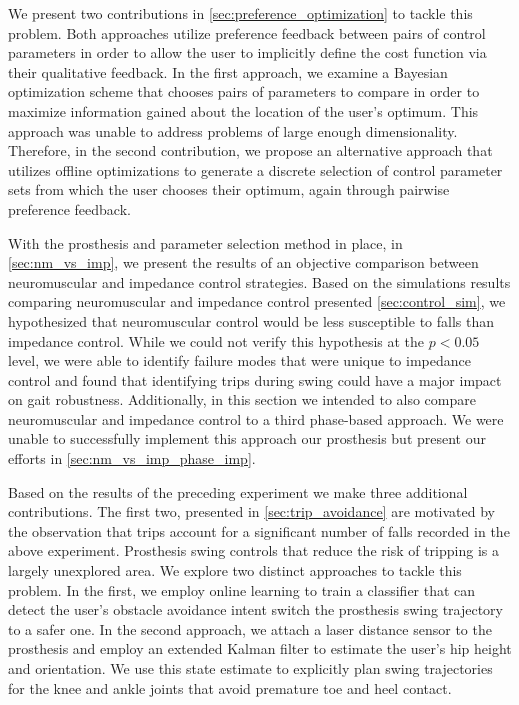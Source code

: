 We present two contributions in \cref{sec:preference_optimization} to tackle
this problem. Both approaches utilize preference feedback between pairs of
control parameters in order to allow the user to implicitly define the cost
function via their qualitative feedback. In the first approach, we examine a
Bayesian optimization scheme that chooses pairs of parameters to compare in
order to maximize information gained about the location of the user's optimum.
This approach was unable to address problems of large enough dimensionality.
Therefore, in the second contribution, we propose an alternative approach that
utilizes offline optimizations to generate a discrete selection of control
parameter sets from which the user chooses their optimum, again through pairwise
preference feedback.

With the prosthesis and parameter selection method in place, in
\cref{sec:nm_vs_imp}, we present the results of an objective comparison between
neuromuscular and impedance control strategies. Based on the simulations results
comparing neuromuscular and impedance control presented \cref{sec:control_sim},
we hypothesized that neuromuscular control would be less susceptible to falls
than impedance control. While we could not verify this hypothesis at the $p <
0.05$ level, we were able to identify failure modes that were unique to
impedance control and found that identifying trips during swing could have a
major impact on gait robustness. Additionally, in this section we intended to
also compare neuromuscular and impedance control to a third phase-based
approach. We were unable to successfully implement this approach our prosthesis
but present our efforts in \cref{sec:nm_vs_imp_phase_imp}.

Based on the results of the preceding experiment we make three
additional contributions. The first two, presented in \cref{sec:trip_avoidance}
are motivated by the observation that trips account for a significant number of
falls recorded in the above experiment. Prosthesis swing controls that reduce
the risk of tripping is a largely unexplored area. We explore two distinct
approaches to tackle this problem. In the first, we employ online learning to
train a classifier that can detect the user's obstacle avoidance intent switch
the prosthesis swing trajectory to a safer one. In the second approach, we
attach a laser distance sensor to the prosthesis and employ an extended Kalman
filter to estimate the user's hip height and orientation. We use this state
estimate to explicitly plan swing trajectories for the knee and ankle joints
that avoid premature toe and heel contact.

